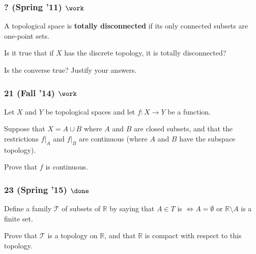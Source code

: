 \hypertarget{spring-11-work}{%
\subsubsection{\texorpdfstring{? (Spring '11)
\(\work\)}{? (Spring '11) \textbackslash work}}\label{spring-11-work}}

\begin{problem}[?]

A topological space is \textbf{totally disconnected} if its only
connected subsets are one-point sets.

Is it true that if \(X\) has the discrete topology, it is totally
disconnected?

Is the converse true? Justify your answers.

\end{problem}

\hypertarget{fall-14-work}{%
\subsubsection{\texorpdfstring{21 (Fall '14)
\(\work\)}{21 (Fall '14) \textbackslash work}}\label{fall-14-work}}

\begin{problem}[?]

Let \(X\) and \(Y\) be topological spaces and let \(f : X \to Y\) be a
function.

Suppose that \(X = A \cup B\) where \(A\) and \(B\) are closed subsets,
and that the restrictions \(f \mathrel{\Big|}_A\) and
\(f \mathrel{\Big|}_B\) are continuous (where \(A\) and \(B\) have the
subspace topology).

Prove that \(f\) is continuous.

\end{problem}

\hypertarget{spring-15-done}{%
\subsubsection{\texorpdfstring{23 (Spring '15)
\(\done\)}{23 (Spring '15) \textbackslash done}}\label{spring-15-done}}

\begin{problem}[?]

Define a family \({\mathcal{T}}\) of subsets of \({\mathbb{R}}\) by
saying that \(A \in T\) is \(\iff A = \emptyset\) or
\({\mathbb{R}}\setminus A\) is a finite set.

Prove that \({\mathcal{T}}\) is a topology on \({\mathbb{R}}\), and that
\({\mathbb{R}}\) is compact with respect to this topology.

\end{problem}

